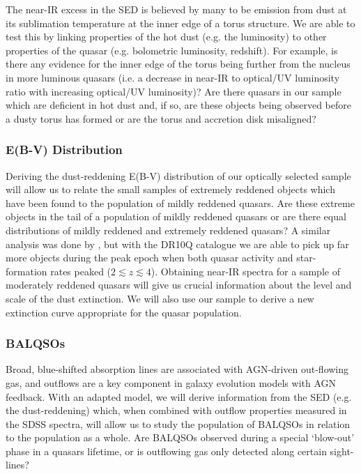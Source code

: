 The near-IR excess in the SED is believed by many to be emission from dust at its sublimation temperature at the inner edge of a torus structure. We are able to test this by linking properties of the hot dust (e.g. the luminosity) to other properties of the quasar (e.g. bolometric luminosity, redshift). For example, is there any evidence for the inner edge of the torus being further from the nucleus in more luminous quasars (i.e. a decrease in near-IR to optical/UV luminosity ratio with increasing optical/UV luminosity)? Are there quasars in our sample which are deficient in hot dust and, if so, are these objects being observed before a dusty torus has formed or are the torus and accretion disk misaligned? 

\subsubsection{E(B-V) Distribution}

Deriving the dust-reddening E(B-V) distribution of our optically selected sample will allow us to relate the small samples of extremely reddened objects which have been found to the population of mildly reddened quasars. Are these extreme objects in the tail of a population of mildly reddened quasars or are there equal distributions of mildly reddened and extremely reddened quasars? A similar analysis was done by \citet{richards03}, but with the DR10Q catalogue we are able to pick up far more objects during the peak epoch when both quasar activity and star-formation rates peaked ($2 \lesssim z \lesssim 4$). Obtaining near-IR spectra for a sample of moderately reddened quasars will give us crucial information about the level and scale of the dust extinction. We will also use our sample to derive a new extinction curve appropriate for the quasar population.

\subsubsection{BALQSOs}

Broad, blue-shifted absorption lines are associated with AGN-driven out-flowing gas, and outflows are a key component in galaxy evolution models with AGN feedback. With an adapted model, we will derive information from the SED (e.g. the dust-reddening) which, when combined with outflow properties measured in the SDSS spectra, will allow us to study the population of BALQSOs in relation to the population as a whole. Are BALQSOs observed during a special `blow-out' phase in a quasars lifetime, or is outflowing gas only detected along certain sight-lines? 

